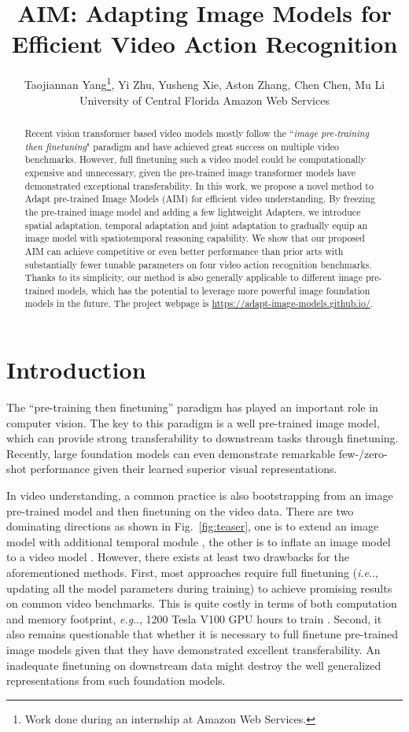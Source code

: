 \documentclass{article} \usepackage{iclr2023_conference,times}
\title{AIM: Adapting Image Models for Efficient Video Action Recognition}
\author{Taojiannan Yang\thanks{Work done during an internship at Amazon Web Services.}, Yi Zhu, Yusheng Xie, Aston Zhang, Chen Chen, Mu Li \\
	University of Central Florida \quad Amazon Web Services
}
\makeatletter
\DeclareRobustCommand\onedot{\futurelet\@let@token\@onedot}
\def\@onedot{\ifx\@let@token.\else.\null\fi\xspace}
\def\eg{\emph{e.g}\onedot} \def\Eg{\emph{E.g}\onedot}
\def\ie{\emph{i.e}\onedot} \def\Ie{\emph{I.e}\onedot}
\makeatother
\begin{document}
	
	\maketitle
	
	\begin{abstract}
		Recent vision transformer based video models mostly follow the ``\textit{image pre-training then finetuning}" paradigm and have achieved great success on multiple video benchmarks. 
		However, full finetuning such a video model could be computationally expensive and unnecessary, given the pre-trained image transformer models have demonstrated exceptional transferability. 
		In this work, we propose a novel method to Adapt pre-trained Image Models (AIM) for efficient video understanding.
		By freezing the pre-trained image model and adding a few lightweight Adapters, we introduce spatial adaptation, temporal adaptation and joint adaptation to gradually equip an image model with spatiotemporal reasoning capability.
		We show that our proposed AIM can achieve competitive or
		even better performance than prior arts with substantially fewer tunable parameters on four video action recognition benchmarks.
		Thanks to its simplicity, our method is also generally applicable to different image pre-trained models, which has the potential to leverage more powerful image foundation models in the future. The project webpage is \url{https://adapt-image-models.github.io/}.
\end{abstract}
	
	\section{Introduction}
The ``pre-training then finetuning'' paradigm has played an important role in computer vision. 
	The key to this paradigm is a well pre-trained image model, which can provide strong transferability to downstream tasks through finetuning. 
	Recently, large foundation models \citep{clip, yuan2021florence, tong2022videomae,align, beitv3} can even demonstrate remarkable few-/zero-shot performance  given their learned superior visual representations.
	
	In video understanding, a common practice is also bootstrapping from an image pre-trained model and then finetuning on the video data. 
There are two dominating directions as shown in Fig.\ \ref{fig:teaser}, one is to extend an image model with additional temporal module \citep{lin2019tsm,zhu2019hidden,arnab2021vivit}, the other is to inflate an image model to a video model \citep{i3d, liu2022videoswin}.
However, there exists at least two drawbacks for the aforementioned methods.
	First, most approaches require full finetuning (\ie, updating all the model parameters during training) to achieve promising results on common video benchmarks. 
	This is quite costly in terms of both computation and memory footprint, \eg, 1200 Tesla V100 GPU hours to train \citet{liu2022videoswin}.
Second, it also remains questionable that whether it is necessary to full finetune pre-trained image models given that they have demonstrated excellent transferability. An inadequate finetuning on downstream data might destroy the well generalized representations from such foundation models. 
	
\end{document}

